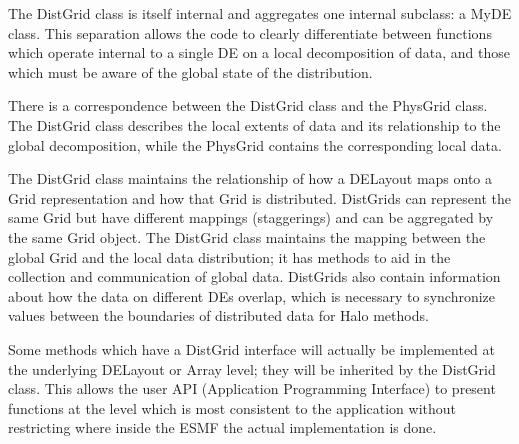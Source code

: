 



The DistGrid class is itself internal and aggregates one internal
subclass: a MyDE class.  This separation allows the code to clearly
differentiate between functions which operate internal to a single DE
on a local decomposition of data, and those which must be aware of the
global state of the distribution.

There is a correspondence between the DistGrid class and the PhysGrid
class.  The DistGrid class describes the local extents of data and
its relationship to the global decomposition, while the PhysGrid contains 
the corresponding local data.  

The DistGrid class maintains the relationship of how a DELayout maps onto
a Grid representation and how that Grid is distributed.  DistGrids can
represent the same Grid but have different mappings (staggerings) and can
be aggregated by the same Grid object. The DistGrid class maintains the
mapping between the global Grid and the local data distribution;  it has
methods to aid in the collection and communication of global data.  
DistGrids also contain information about how the data on different DEs
overlap, which is necessary to synchronize values between the boundaries
of distributed data for Halo methods.

Some methods which have a DistGrid interface will actually be
implemented at the underlying DELayout or Array level; they
will be inherited by the DistGrid class.  This allows the user
API (Application Programming Interface) to present functions at
the level which is most consistent to the application without
restricting where inside the ESMF the actual implementation
is done.
